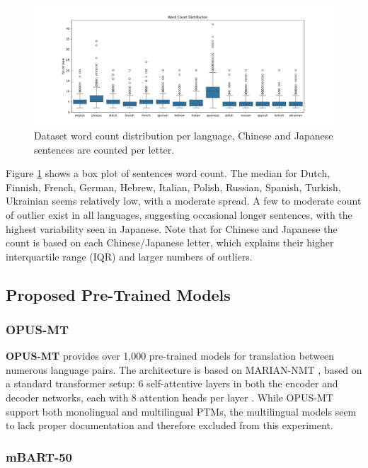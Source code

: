 \documentclass[a4paper]{article}
\begin{document}
\begin{figure}[htbp]
    \centering
    \includegraphics[width=1\linewidth]{figures/word_count_box.png}
    \caption{Dataset word count distribution per language, Chinese and Japanese sentences are counted per letter.}
    \label{fig:word_count_box}
\end{figure}

Figure \ref{fig:word_count_box} shows a box plot of sentences word count. The median for Dutch, Finnish, French, German, Hebrew, Italian, Polish, Russian, Spanish, Turkish, Ukrainian seems relatively low, with a moderate spread. A few to moderate count of outlier exist in all languages, suggesting occasional longer sentences, with the highest variability seen in Japanese. Note that for Chinese and Japanese the count is based on each Chinese/Japanese letter, which explains their higher interquartile range (IQR) and larger numbers of outliers.

\subsection{Proposed Pre-Trained Models}

\subsubsection{OPUS-MT}

\textbf{OPUS-MT} \cite{tiedemann-2023-democratizing,tiedemann-2020-opus-mt} provides over 1,000 pre-trained models for translation between numerous language pairs. The architecture is based on MARIAN-NMT \cite{mariannmt}, based on a standard transformer setup: 6 self-attentive layers in both the encoder and decoder networks, each with 8 attention heads per layer \cite{tiedemann-2020-opus-mt}. While OPUS-MT support both monolingual and multilingual PTMs, the multilingual models seem to lack proper documentation and therefore excluded from this experiment.

\subsubsection{mBART-50}
\end{document}

